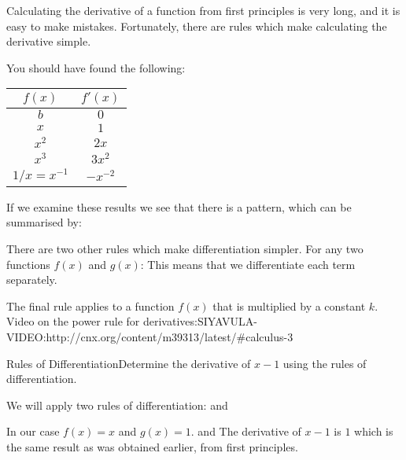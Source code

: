 Calculating the derivative of a function from first principles is very long, and it is easy to make mistakes. Fortunately, there are rules which make calculating the derivative simple.


You should have found the following:

\begin{center}
\begin{tabular}{|c|c|}\hline
$f(x)$&$f'(x)$\\\hline\hline
$b$&$0$\\\hline
$x$&$1$\\\hline
$x^2$&$2x$\\\hline
$x^3$&$3x^2$\\\hline
$1/x=x^{-1}$&$-x^{-2}$\\\hline
\end{tabular}
\end{center}

If we examine these results we see that there is a pattern, which can be summarised by:

There are two other rules which make differentiation simpler. For any two functions $f(x)$ and $g(x)$:
This means that we differentiate each term separately. 

The final rule applies to a function $f(x)$ that is multiplied by a constant $k$.
Video on the power rule for derivatives:SIYAVULA-VIDEO:http://cnx.org/content/m39313/latest/#calculus-3

\begin{wex}{Rules of Differentiation}{Determine the derivative of $x-1$ using the rules of differentiation.}{
We will apply two rules of differentiation:
and

In our case $f(x)=x$ and $g(x)=1$.
and
The derivative of $x-1$ is $1$ which is the same result as was obtained earlier, from first principles.
}
\end{wex}

